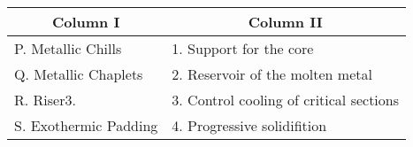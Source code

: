 \begin{tabular}{|l|l|}
\hline
\multicolumn{1}{|c|}{\textbf{Column I}}    & \multicolumn{1}{|c|}{\textbf{Column II}} \\
\hline
P. Metallic Chills           &1. Support for the core\\
\hline
Q. Metallic Chaplets   &2. Reservoir of the molten metal\\
\hline
R. Riser3. &3. Control cooling of critical sections\\
\hline
S. Exothermic Padding  &4. Progressive solidifition\\
\hline
\end{tabular}